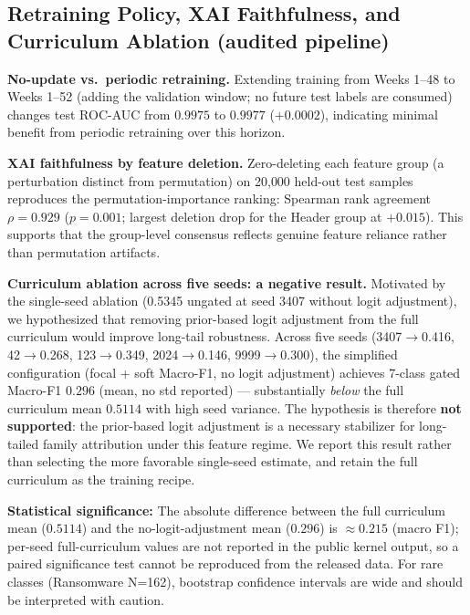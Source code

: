 \documentclass[Number]{sn-jnl}
\begin{document}
\subsection*{Retraining Policy, XAI Faithfulness, and Curriculum Ablation (audited pipeline)}

\noindent\textbf{No-update vs.\ periodic retraining.}
Extending training from Weeks 1--48 to Weeks 1--52 (adding the validation window; no future test labels are consumed) changes test ROC-AUC from $0.9975$ to $0.9977$ ($+0.0002$), indicating minimal benefit from periodic retraining over this horizon.

\noindent\textbf{XAI faithfulness by feature deletion.}
Zero-deleting each feature group (a perturbation distinct from permutation) on 20{,}000 held-out test samples reproduces the permutation-importance ranking: Spearman rank agreement $\rho = 0.929$ ($p = 0.001$; largest deletion drop for the Header group at $+0.015$). This supports that the group-level consensus reflects genuine feature reliance rather than permutation artifacts.

\noindent\textbf{Curriculum ablation across five seeds: a negative result.}
Motivated by the single-seed ablation (0.5345 ungated at seed 3407 without logit adjustment), we hypothesized that removing prior-based logit adjustment from the full curriculum would improve long-tail robustness. Across five seeds (3407$\to$0.416, 42$\to$0.268, 123$\to$0.349, 2024$\to$0.146, 9999$\to$0.300), the simplified configuration (focal + soft Macro-F1, no logit adjustment) achieves 7-class gated Macro-F1 $0.296$ (mean, no std reported) --- substantially \emph{below} the full curriculum mean $0.5114$ with high seed variance. The hypothesis is therefore \textbf{not supported}: the prior-based logit adjustment is a necessary stabilizer for long-tailed family attribution under this feature regime. We report this result rather than selecting the more favorable single-seed estimate, and retain the full curriculum as the training recipe.

\textbf{Statistical significance:} The absolute difference between the full curriculum mean ($0.5114$) and the no-logit-adjustment mean ($0.296$) is $\approx0.215$ (macro F1); per-seed full-curriculum values are not reported in the public kernel output, so a paired significance test cannot be reproduced from the released data.  For rare classes (Ransomware N=162), bootstrap confidence intervals are wide and should be interpreted with caution.
\end{document}
